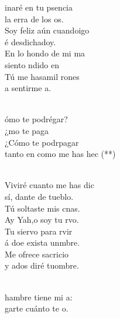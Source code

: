 \documentclass[12pt]{article}
\begin{document}
\begin{multicols*}{2}
\begin{cancion}%
	inaré en tu psencia \\
	 la erra de los os.\\
	Soy feliz aún cuandoigo \\
	é desdichadoy.\\
	En lo hondo de mi ma \\
	siento ndido en   \\
	Tú me hasamil rones \\
	a sentirme a. \\\jump\\
	\begin{chorus}%
	ómo te podrégar?\\
	¿mo te paga  \\
	¿Cómo te podrpagar \\
	tanto en como me has hec (**)\\
	\end{chorus}%
	\jump\\
	Viviré cuanto me has dic \\
	sí, dante de tueblo.\\
	Tú soltaste mis cnas.\\
	Ay Yah,o soy tu rvo. \\
	Tu siervo para rvir \\
	á doe exista unmbre.\\
	Me ofrece sacricio  \\
	y ados diré tuombre.\\\jump\\
	\begin{chorus}%
	hambre tiene mi a:\\
	garte cuánto te o.\\

\end{chorus}
\end{cancion}
\end{multicols*}
\end{document}
